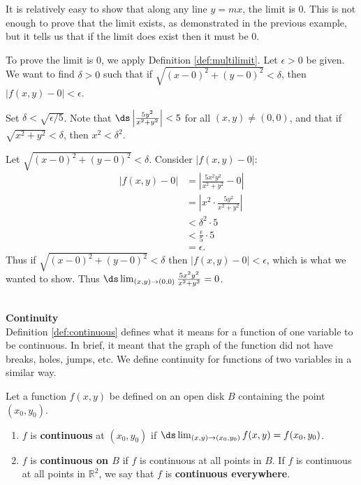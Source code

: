 {It is relatively easy to show that along any line $y=mx$, the limit is 0. This is not enough to prove that the limit exists, as demonstrated in the previous example, but it tells us that if the limit does exist then it must be 0.

To prove the limit is 0, we apply Definition \ref{def:multilimit}. Let $\epsilon >0$ be given. We want to find $\delta >0$ such that if $\sqrt{(x-0)^2+(y-0)^2} <\delta$, then $|f(x,y)-0| <\epsilon$.

Set $\delta < \sqrt{\epsilon/5}$. Note that $\ds \left|\frac{5y^2}{x^2+y^2}\right| <5$ for all $(x,y)\neq (0,0)$, and that if $\sqrt{x^2+y^2} <\delta$, then $x^2<\delta^2$.

Let $\sqrt{(x-0)^2+(y-0)^2}<\delta$. Consider $|f(x,y)-0|$:
\begin{align*}
|f(x,y)-0| &= \left|\frac{5x^2y^2}{x^2+y^2}-0\right| \\
				&= \left|x^2\cdot\frac{5y^2}{x^2+y^2}\right|\\
				&< \delta^2\cdot 5 \\
				&< \frac{\epsilon}{5}\cdot 5 \\
				&= \epsilon.
\end{align*}
Thus if $\sqrt{(x-0)^2+(y-0)^2}<\delta$ then $|f(x,y)-0|<\epsilon$, which is what we wanted to show. Thus $\ds \lim_{(x,y)\to(0,0)} \frac{5x^2y^2}{x^2+y^2} = 0$.
}\\

\noindent\textbf{\large Continuity}\\

Definition \ref{def:continuous} defines what it means for a function of one variable to be continuous. In brief, it meant that the graph of the function did not have breaks, holes, jumps, etc. We define continuity for functions of two variables in a similar way.

{Let a function $f(x,y)$ be defined on an open disk $B$ containing the point $(x_0,y_0)$. 

\begin{enumerate}
	\item $f$ is \textbf{continuous} at $(x_0,y_0)$ if $\ds\lim_{(x,y)\to(x_0,y_0)} f(x,y) = f(x_0,y_0)$.
	\item	$f$ is \textbf{continuous on $B$} if $f$ is continuous at all points in $B$. If $f$ is continuous at all points in $\mathbb{R}^2$, we say that $f$ is \textbf{continuous everywhere}.
\end{enumerate}
}

